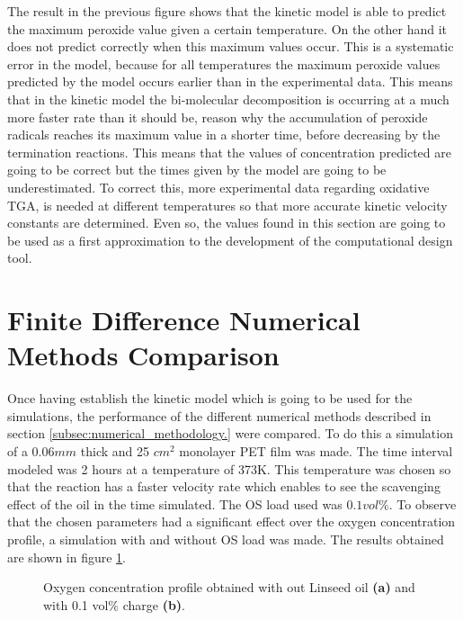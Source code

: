 \begin{refsection}
The result in the previous figure shows that the kinetic model is able to predict the maximum peroxide value given a certain temperature. On the other hand it does not predict correctly when this maximum values occur. This is a systematic error in the model, because for all temperatures the maximum peroxide values predicted by the model occurs earlier than in the experimental data. This means that in the kinetic model the  bi-molecular decomposition is occurring at a much more faster rate than it should be, reason why the accumulation of peroxide radicals reaches its maximum value in a shorter time, before decreasing by the termination reactions. This means that the values of concentration  predicted are going to be correct but the times given by the model are going to be underestimated. To correct this, more experimental data regarding oxidative TGA, is needed at different temperatures so 
that more accurate kinetic velocity constants are determined. Even so, the values found in this section are going to be used as a first approximation to the development of the computational design tool.  

\section{Finite Difference Numerical Methods Comparison}
Once having establish the kinetic model which is going to be used for the simulations, the performance of the different numerical methods described in section \ref{subsec:numerical_methodology.} were compared. To do this a simulation of a 0.06$mm$ thick and 25 $cm^2$ monolayer PET film was made. The time interval modeled was 2 hours at a temperature of 373K. This temperature was  chosen so that the reaction has a faster velocity rate which enables to see the scavenging effect of the oil in the time simulated. The OS load used was $0.1 vol\%$. To observe that the chosen parameters had a significant effect over the oxygen concentration profile, a simulation with and without OS load was made. The results obtained are shown in figure \ref{fig:oxygen_profile with and without OS}. 

\begin{figure}[ht]
    \centering
    \caption{Oxygen concentration profile obtained with out Linseed oil \textbf{(a)} and with 0.1 vol\% charge \textbf{(b)}.  }
    \label{fig:oxygen_profile with and without OS}
\end{figure}


\end{refsection}
